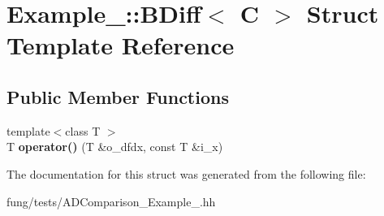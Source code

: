 \hypertarget{structExample__2_1_1BDiff}{\section{Example\-\_\-:\-:B\-Diff$<$ C $>$ Struct Template Reference}
\label{structExample__2_1_1BDiff}
}
\subsection*{Public Member Functions}
\begin{DoxyCompactItemize}
\item 
\hypertarget{structExample__2_1_1BDiff_aa4baea9ef892c52aeb55438e536a865a}{{\footnotesize template$<$class T $>$ }\\T {\bfseries operator()} (T \&o\-\_\-dfdx, const T \&i\-\_\-x)}\label{structExample__2_1_1BDiff_aa4baea9ef892c52aeb55438e536a865a}

\end{DoxyCompactItemize}


The documentation for this struct was generated from the following file\-:\begin{DoxyCompactItemize}
\item 
fung/tests/A\-D\-Comparison\-\_\-\-Example\-\_.\-hh\end{DoxyCompactItemize}
